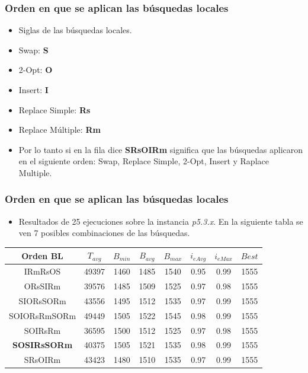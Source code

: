 \documentclass{beamer}
\begin{document}

\begin{frame}
\frametitle{Orden en que se aplican las búsquedas locales}

\begin{itemize}
    \item Siglas de las búsquedas locales.
    \pause
    \item Swap: \textbf{S}
    \pause
    \item 2-Opt: \textbf{O}
    \pause
    \item Insert: \textbf{I}
    \pause
    \item Replace Simple: \textbf{Rs}
    \pause
    \item Replace Múltiple: \textbf{Rm}
    \pause
    \item Por lo tanto si en la fila dice \textbf{SRsOIRm} significa que las búsquedas aplicaron en el siguiente orden: Swap, Replace Simple, 2-Opt, Insert y Raplace Multiple.    
\end{itemize}

\end{frame}


\begin{frame}
\frametitle{Orden en que se aplican las búsquedas locales}

\begin{itemize}
    \item Resultados de 25 ejecuciones sobre la instancia \textit{p5.3.x}. En la siguiente tabla se ven 7 posibles combinaciones de las búsquedas.
\end{itemize}

\begin{table}
\begin{center}
\begin{tabular}{ |c|c|c|c|c|c|c|c| } 
\hline
Orden BL & $T_{avg}$ & $B_{min}$ & $B_{avg}$ & $B_{max}$ & $i_{eAvg}$ & $i_{eMax}$ & $Best$ \\
\hline
IRmRsOS & 49397 & 1460 & 1485 & 1540 & 0.95 & 0.99 & 1555  \\
ORsSIRm & 39576 & 1485 & 1509 & 1525 & 0.97 & 0.98 & 1555  \\
SIORsSORm & 43556 & 1495 & 1512 & 1535 & 0.97 & 0.99 & 1555  \\
SOIORsRmSORm & 49449 & 1505 & 1522 & 1545 & 0.98 & 0.99 & 1555  \\
SOIRsRm & 36595 & 1500 & 1512 & 1525 & 0.97 & 0.98 & 1555  \\
\textbf{SOSIRsSORm} & 40375 & 1505 & 1521 & 1535 & 0.98 & 0.99 & 1555  \\
SRsOIRm & 43423 & 1480 & 1510 & 1535 & 0.97 & 0.99 & 1555  \\
\hline
\end{tabular}
\end{center}
\label{tab:resultadosListaLS1}
\end{table}

\end{frame}
\end{document}
